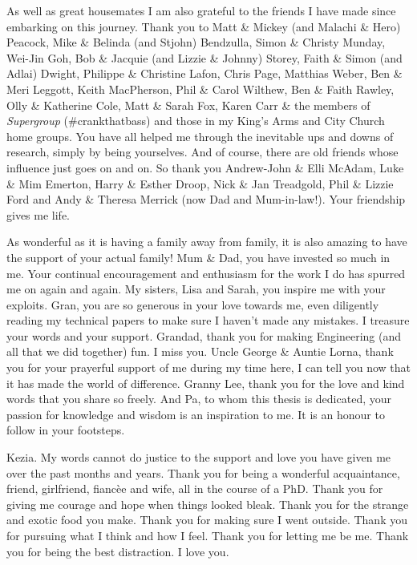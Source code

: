 \documentclass[a4paper,11pt,twoside,openright]{book}
\begin{document}
As well as great housemates I am also grateful to the friends I have made since embarking on this journey. Thank you to Matt \& Mickey {\small(and Malachi \& Hero)} Peacock, Mike \& Belinda {\small(and Stjohn)} Bendzulla, Simon \& Christy Munday, Wei-Jin Goh, Bob \& Jacquie {\small (and Lizzie \& Johnny)} Storey, Faith \& Simon {\small(and Adlai)} Dwight, Philippe \& Christine Lafon, Chris Page, Matthias Weber, Ben \& Meri Leggott, Keith MacPherson, Phil \& Carol Wilthew, Ben \& Faith Rawley, Olly \& Katherine Cole, Matt \& Sarah Fox, Karen Carr \& the members of \textit{Supergroup} {\small(\#crankthatbass)} and those in my King's Arms and City Church home groups. You have all helped me through the inevitable ups and downs of research, simply by being yourselves. And of course, there are old friends whose influence just goes on and on. So thank you Andrew-John \& Elli McAdam, Luke \& Mim Emerton, Harry \& Esther Droop, Nick \& Jan Treadgold, Phil \& Lizzie Ford and Andy \& Theresa Merrick {\small (now Dad and Mum-in-law!).} Your friendship gives me life.



As wonderful as it is having a family away from family, it is also amazing to have the support of your actual family! Mum \& Dad, you have invested so much in me. Your continual encouragement and enthusiasm for the work I do has spurred me on again and again. My sisters, Lisa and Sarah, you inspire me with your exploits. Gran, you are so generous in your love towards me, even diligently reading my technical papers to make sure I haven't made any mistakes. I treasure your words and your support. Grandad, thank you for making Engineering (and all that we did together) fun. I miss you. Uncle George \& Auntie Lorna, thank you for your prayerful support of me during my time here, I can tell you now that it has made the world of difference. Granny Lee, thank you for the love and kind words that you share so freely. And Pa, to whom this thesis is dedicated, your passion for knowledge and wisdom is an inspiration to me. It is an honour to follow in your footsteps.


Kezia. My words cannot do justice to the support and love you have given me over the past months and years. Thank you for being a wonderful acquaintance, friend, girlfriend, fianc\`{e}e and wife, all in the course of a PhD. Thank you for giving me courage and hope when things looked bleak. Thank you for the strange and exotic food you make. Thank you for making sure I went outside. Thank you for pursuing what I think and how I feel. Thank you for letting me be me. Thank you for being the best distraction. I love you.
\end{document}
